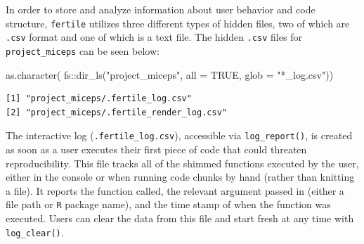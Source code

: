 \documentclass[12pt,twoside]{reedthesis}
\newenvironment{Shaded}{\begin{snugshade}}{\end{snugshade}}
\newcommand{\AttributeTok}[1]{\textcolor[rgb]{0.77,0.63,0.00}{#1}}
\newcommand{\ConstantTok}[1]{\textcolor[rgb]{0.00,0.00,0.00}{#1}}
\newcommand{\FunctionTok}[1]{\textcolor[rgb]{0.00,0.00,0.00}{#1}}
\newcommand{\NormalTok}[1]{#1}
\newcommand{\SpecialCharTok}[1]{\textcolor[rgb]{0.00,0.00,0.00}{#1}}
\newcommand{\StringTok}[1]{\textcolor[rgb]{0.31,0.60,0.02}{#1}}
\begin{document}
In order to store and analyze information about user behavior and code structure, \texttt{fertile} utilizes three different types of hidden files, two of which are \texttt{.csv} format and one of which is a text file. The hidden \texttt{.csv} files for \texttt{project\_miceps} can be seen below:
\begin{Shaded}
\begin{Highlighting}[]
\FunctionTok{as.character}\NormalTok{(}
\NormalTok{  fs}\SpecialCharTok{::}\FunctionTok{dir\_ls}\NormalTok{(}\StringTok{"project\_miceps"}\NormalTok{, }\AttributeTok{all =} \ConstantTok{TRUE}\NormalTok{, }\AttributeTok{glob =} \StringTok{"*\_log.csv"}\NormalTok{))}
\end{Highlighting}
\end{Shaded}
\begin{verbatim}
[1] "project_miceps/.fertile_log.csv"       
[2] "project_miceps/.fertile_render_log.csv"
\end{verbatim}
The interactive log (\texttt{.fertile\_log.csv}), accessible via \texttt{log\_report()}, is created as soon as a user executes their first piece of code that could threaten reproducibility. This file tracks all of the shimmed functions executed by the user, either in the console or when running code chunks by hand (rather than knitting a file). It reports the function called, the relevant argument passed in (either a file path or \texttt{R} package name), and the time stamp of when the function was executed. Users can clear the data from this file and start fresh at any time with \texttt{log\_clear()}.
\end{document}
